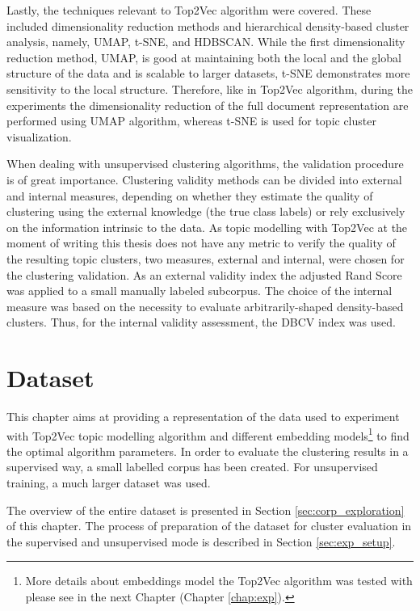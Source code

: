 \documentclass[fontsize=12pt,a4paper,twoside,openany]{scrbook}
\begin{document}
Lastly, the techniques relevant to Top2Vec algorithm were covered. These included dimensionality reduction methods and hierarchical density-based cluster analysis, namely, UMAP, t-SNE, and HDBSCAN. While the first dimensionality reduction method, UMAP, is good at maintaining both the local and the global structure of the data and is scalable to larger datasets, t-SNE demonstrates more sensitivity to the local structure. Therefore, like in Top2Vec algorithm, during the experiments the dimensionality reduction of the full document representation are performed using UMAP algorithm, whereas t-SNE is used for topic cluster visualization.

When dealing with unsupervised clustering algorithms, the validation procedure is of great importance. Clustering validity methods can be divided into external and internal measures, depending on whether they estimate the quality of clustering using the external knowledge (the true class labels) or rely exclusively on the information intrinsic to the data. As topic modelling with Top2Vec at the moment of writing this thesis does not have any metric to verify the quality of the resulting topic clusters, two measures, external and internal, were chosen for the clustering validation. As an external validity index the adjusted Rand Score was applied to a small manually labeled subcorpus. The choice of the internal measure was based on the necessity to evaluate arbitrarily-shaped density-based clusters. Thus, for the internal validity assessment, the DBCV index was used.

\chapter{Dataset}
\label{chap:dataset}
This chapter aims at providing a representation of the data used to experiment with Top2Vec topic modelling algorithm and different embedding models\footnote{More details about embeddings model the Top2Vec algorithm was tested with please see in the next Chapter (Chapter \ref{chap:exp}).} to find the optimal algorithm parameters. In order to evaluate the clustering results in a supervised way, a small labelled corpus has been created. For unsupervised training, a much larger dataset was used. 

The overview of the entire dataset is presented in Section \ref{sec:corp_exploration} of this chapter. The process of preparation of the dataset for cluster evaluation in the supervised and unsupervised mode is described in Section \ref{sec:exp_setup}.
\end{document}
